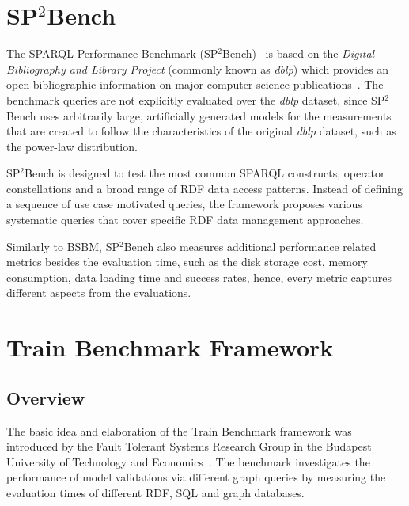 \section{SP$^2$Bench}

The SPARQL Performance Benchmark (SP$^2$Bench)~\cite{sp2bench} is based on the \textit{Digital Bibliography and Library Project} (commonly known as \textit{dblp}) which provides an open bibliographic information on major computer science publications~\cite{dblp}. The benchmark queries are not explicitly evaluated over the \textit{dblp} dataset, since SP$^2$Bench uses arbitrarily large, artificially generated models for the measurements that are created to follow the characteristics of the original \textit{dblp} dataset, such as the power-law distribution.

SP$^2$Bench is designed to test the most common SPARQL constructs, operator constellations and a broad range of RDF data access patterns. Instead of defining a sequence of use case motivated queries, the framework proposes various systematic queries that cover specific RDF data management approaches.

Similarly to BSBM, SP$^2$Bench also measures additional performance related metrics besides the evaluation time, such as the disk storage cost, memory consumption, data loading time and success rates, hence, every metric captures different aspects from the evaluations.

\section{Train Benchmark Framework}\label{sec:train}

\subsection{Overview}

The basic idea and elaboration of the Train Benchmark framework was introduced by the Fault Tolerant Systems Research Group in the Budapest University of Technology and Economics~\cite{tb_report}. The benchmark investigates the performance of model validations via different graph queries by measuring the evaluation times of different RDF, SQL and graph databases.

